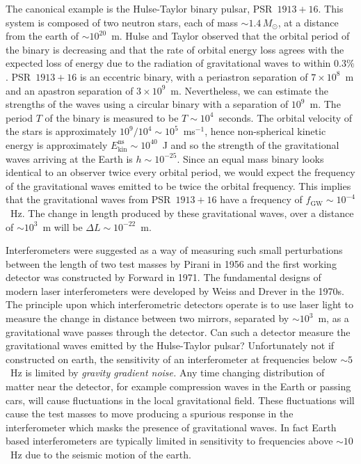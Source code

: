 The canonical example is the Hulse-Taylor binary pulsar,
PSR~$1913+16$\cite{1975ApJ...195L..51H}. This system is composed of two
neutron stars, each of mass $\sim 1.4\,M_\odot$, at a distance from the earth
of $\sim 10^{20}$~m. Hulse and Taylor observed that the orbital period of the
binary is decreasing and that the rate of orbital energy loss agrees with the
expected loss of energy due to the radiation of gravitational waves to within
$0.3\%$\cite{Taylor:1982,Taylor:1989}. PSR~$1913+16$ is an eccentric binary,
with a periastron separation of $7\times10^{8}$~m and an apastron separation
of $3\times10^{9}$~m. Nevertheless, we can estimate the strengths of the waves
using a circular binary with a separation of $10^{9}$~m. The period $T$ of the
binary is measured to be $T\sim 10^4$~seconds.
The orbital velocity of the stars is
approximately $10^9 / 10^4 \sim 10^5$~ms$^{-1}$, hence non-spherical kinetic
energy is approximately $E^\mathrm{ns}_\mathrm{kin} \sim 10^{40}$~J and so the
strength of the gravitational waves arriving at the Earth is $h \sim
10^{-25}$. Since an equal mass binary looks identical to an observer twice
every orbital period, we would expect the frequency of the gravitational waves
emitted to be twice the orbital frequency. This implies that the gravitational
waves from PSR~$1913+16$ have a frequency of $f_\mathrm{GW} \sim 10^{-4}$~Hz.
The change in length produced by these gravitational waves, over a distance of
$\sim 10^3$~m will be $\Delta L \sim 10^{-22}$~m.

Interferometers were suggested as a way of measuring such small
perturbations between the length of two test masses by Pirani in
1956\cite{Pirani:1956} and the first working detector was constructed by
Forward in 1971\cite{Forward:1971}. The fundamental designs of modern laser
interferometers were developed by Weiss\cite{Weiss:1972} and
Drever\cite{Drever:1980} in the 1970s. The principle upon which
interferometric detectors operate is to use laser light to measure the change
in distance between two mirrors, separated by $\sim 10^{3}$~m, as a
gravitational wave passes through the detector. Can such a detector measure
the gravitational waves emitted by the Hulse-Taylor pulsar? Unfortunately not
if constructed on earth\cite{Saulson:1994}, the sensitivity of an
interferometer at frequencies below $\sim 5$~Hz is limited by \emph{gravity
gradient noise.} Any time changing distribution of matter near the detector,
for example compression waves in the Earth or passing cars, will cause
fluctuations in the local gravitational field. These fluctuations will cause
the test masses to move producing a spurious response in the interferometer
which masks the presence of gravitational waves. In fact Earth based
interferometers are typically limited in sensitivity to frequencies above
$\sim 10$~Hz due to the seismic motion of the earth.


